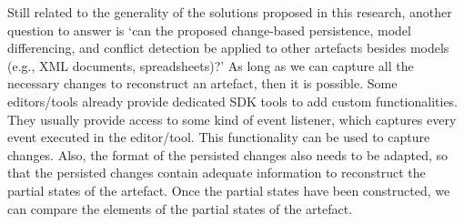 Still related to the generality of the solutions proposed in this research, another question to answer is ‘can the proposed change-based persistence, model differencing, and conflict detection be applied to other artefacts besides models (e.g., XML documents, spreadsheets)?’ As long as we can capture all the necessary changes to reconstruct an artefact, then it is possible. Some editors/tools already provide dedicated SDK tools to add custom functionalities. They usually provide access to some kind of event listener, which captures every event executed in the editor/tool. This functionality can be used to capture changes. Also, the format of the persisted changes also needs to be adapted, so that the persisted changes contain adequate information to reconstruct the partial states of the artefact. Once the partial states have been constructed, we can compare the elements of the partial states of the artefact.

